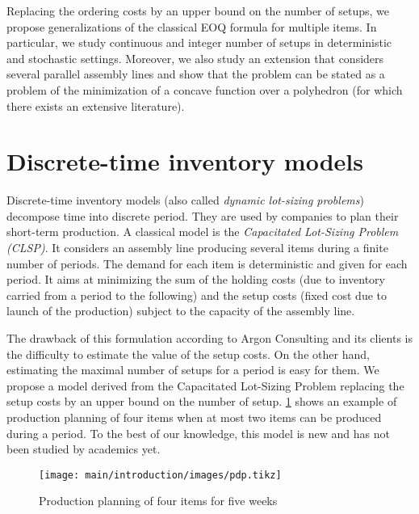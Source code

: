 \medskip


Replacing the ordering costs by an upper bound on the number of setups, we propose generalizations of the classical EOQ formula for multiple items.
In particular, we study continuous and integer number of setups in deterministic and stochastic settings.
Moreover, we also study an extension that considers several parallel assembly lines and show that the problem can be stated as a problem of the minimization of a concave function over a polyhedron (for which there exists an extensive literature).




\section{Discrete-time inventory models}
\label{sec:intro:en:discrete-time-inventory-models}


Discrete-time inventory models (also called \emph{dynamic lot-sizing problems}) decompose time into discrete period.
They are used by companies to plan their short-term production.
A classical model is the \emph{Capacitated Lot-Sizing Problem (CLSP)}.
It considers an assembly line producing several items during a finite number of periods.
The demand for each item is deterministic and given for each period.
It aims at minimizing the sum of the holding costs (due to inventory carried from a period to the following) and the setup costs (fixed cost due to launch of the production) subject to the capacity of the assembly line.


The drawback of this formulation according to Argon Consulting and its clients is the difficulty to estimate the value of the setup costs.
On the other hand, estimating the maximal number of setups for a period is easy for them.
We propose a model derived from the Capacitated Lot-Sizing Problem replacing the setup costs by an upper bound on the number of setup.
\cref{fig:intro:en:pdp} shows an example of production planning of four items when at most two items can be produced during a period.
To the best of our knowledge, this model is new and has not been studied by academics yet.

\begin{figure}[!ht]
  \centering
  \texttt{[image: main/introduction/images/pdp.tikz]}
  \caption{Production planning of four items for five weeks}
  \label{fig:intro:en:pdp}
\end{figure}



